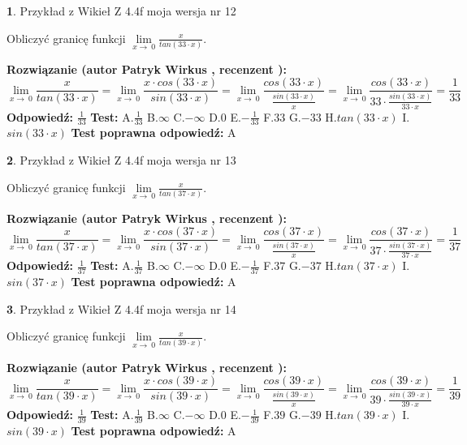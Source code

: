 \documentclass[12pt, a4paper]{article}
\theoremstyle{definition} %
\newtheorem{zad}{}
\newcommand{\zadStart}[1]{\begin{zad}#1\newline}
\newcommand{\zadStop}{\end{zad}}
\newcommand{\rozwStart}[2]{\noindent \textbf{Rozwiązanie (autor #1 , recenzent #2): }\newline}
\newcommand{\rozwStop}{\newline}
\newcommand{\odpStart}{\noindent \textbf{Odpowiedź:}\newline}
\newcommand{\odpStop}{\newline}
\newcommand{\testStart}{\noindent \textbf{Test:}\newline}
\newcommand{\testStop}{\newline}
\newcommand{\kluczStart}{\noindent \textbf{Test poprawna odpowiedź:}\newline}
\newcommand{\kluczStop}{\newline}
\begin{document}
\zadStart{Przykład z Wikieł Z 4.4f moja wersja nr 12}


Obliczyć granicę funkcji $\lim\limits_{x\to\ 0}\frac{x}{tan(33 \cdot x)}$.
\zadStop
\rozwStart{Patryk Wirkus}{}
$$\lim\limits_{x\to\ 0}\frac{x}{tan(33 \cdot x)}=\lim\limits_{x\to\ 0}\frac{x \cdot cos(33 \cdot x)}{sin(33 \cdot x)}=\lim\limits_{x\to\ 0}\frac{cos(33 \cdot x)}{\frac{sin(33 \cdot x)}{x}}=\lim\limits_{x\to\ 0}\frac{cos(33 \cdot x)}{33 \cdot \frac{sin(33 \cdot x)}{33 \cdot x}} = \frac{1}{33}$$
\rozwStop
\odpStart
$\frac{1}{33}$
\odpStop
\testStart
A.$\frac{1}{33}$
B.$\infty$
C.$-\infty$
D.$0$
E.$-\frac{1}{33}$
F.$33$
G.$-33$
H.$tan(33 \cdot x)$
I.$sin(33 \cdot x)$
\testStop
\kluczStart
A
\kluczStop



\zadStart{Przykład z Wikieł Z 4.4f moja wersja nr 13}


Obliczyć granicę funkcji $\lim\limits_{x\to\ 0}\frac{x}{tan(37 \cdot x)}$.
\zadStop
\rozwStart{Patryk Wirkus}{}
$$\lim\limits_{x\to\ 0}\frac{x}{tan(37 \cdot x)}=\lim\limits_{x\to\ 0}\frac{x \cdot cos(37 \cdot x)}{sin(37 \cdot x)}=\lim\limits_{x\to\ 0}\frac{cos(37 \cdot x)}{\frac{sin(37 \cdot x)}{x}}=\lim\limits_{x\to\ 0}\frac{cos(37 \cdot x)}{37 \cdot \frac{sin(37 \cdot x)}{37 \cdot x}} = \frac{1}{37}$$
\rozwStop
\odpStart
$\frac{1}{37}$
\odpStop
\testStart
A.$\frac{1}{37}$
B.$\infty$
C.$-\infty$
D.$0$
E.$-\frac{1}{37}$
F.$37$
G.$-37$
H.$tan(37 \cdot x)$
I.$sin(37 \cdot x)$
\testStop
\kluczStart
A
\kluczStop



\zadStart{Przykład z Wikieł Z 4.4f moja wersja nr 14}


Obliczyć granicę funkcji $\lim\limits_{x\to\ 0}\frac{x}{tan(39 \cdot x)}$.
\zadStop
\rozwStart{Patryk Wirkus}{}
$$\lim\limits_{x\to\ 0}\frac{x}{tan(39 \cdot x)}=\lim\limits_{x\to\ 0}\frac{x \cdot cos(39 \cdot x)}{sin(39 \cdot x)}=\lim\limits_{x\to\ 0}\frac{cos(39 \cdot x)}{\frac{sin(39 \cdot x)}{x}}=\lim\limits_{x\to\ 0}\frac{cos(39 \cdot x)}{39 \cdot \frac{sin(39 \cdot x)}{39 \cdot x}} = \frac{1}{39}$$
\rozwStop
\odpStart
$\frac{1}{39}$
\odpStop
\testStart
A.$\frac{1}{39}$
B.$\infty$
C.$-\infty$
D.$0$
E.$-\frac{1}{39}$
F.$39$
G.$-39$
H.$tan(39 \cdot x)$
I.$sin(39 \cdot x)$
\testStop
\kluczStart
A
\kluczStop
\end{document}
